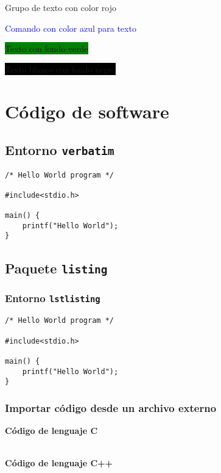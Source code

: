 \documentclass{article}
\begin{document}
{\color{red} Grupo de texto con color rojo}

\textcolor{blue}{Comando con color azul para texto}

\colorbox{green}{Texto con fondo verde}

\colorbox{black}{\color{white} Texto blanco con fondo negro}



\section{Código de software}

\subsection{Entorno \texttt{verbatim}}

\begin{verbatim}
/* Hello World program */

#include<stdio.h>

main() {
    printf("Hello World");
}
\end{verbatim}

\subsection{Paquete \texttt{listing}}

\subsubsection{Entorno \texttt{lstlisting}}

\begin{lstlisting}
/* Hello World program */

#include<stdio.h>

main() {
    printf("Hello World");
}
\end{lstlisting}

\subsubsection{Importar código desde un archivo externo}

\textbf{Código de lenguaje C}



~\\

\textbf{Código de lenguaje C++}


\end{document}
